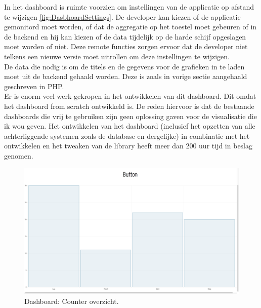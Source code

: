 In het dashboard is ruimte voorzien om instellingen van de applicatie op afstand te wijzigen \ref{fig:DasbhoardSettings}. De developer kan kiezen of de applicatie gemonitord moet worden, of dat de aggregatie op het toestel moet gebeuren of in de backend en hij kan kiezen of de data tijdelijk op de harde schijf opgeslagen moet worden of niet. Deze remote functies zorgen ervoor dat de developer niet telkens een nieuwe versie moet uitrollen om deze instellingen te wijzigen.\\


De data die nodig is om de titels en de gegevens voor de grafieken in te laden moet uit de backend gehaald worden. Deze is zoals in vorige sectie aangehaald geschreven in PHP. \\ 

Er is enorm veel werk gekropen in het ontwikkelen van dit dashboard. Dit omdat het dashboard from scratch ontwikkeld is. De reden hiervoor is dat de bestaande dashboards die vrij te gebruiken zijn geen oplossing gaven voor de visualisatie die ik wou geven. Het ontwikkelen van het dashboard (inclusief het opzetten van alle achterliggende systemen zoals de database en dergelijke) in combinatie met het ontwikkelen en het tweaken van de library heeft meer dan 200 uur tijd in beslag genomen.

\begin{figure}[!h]
  \centering
  \includegraphics[scale=0.2]{Afbeeldingen/Implementatie/Counter}
  \caption{Dashboard: Counter overzicht.}
  \label{fig:DasbhoardCounter}
\end{figure}

